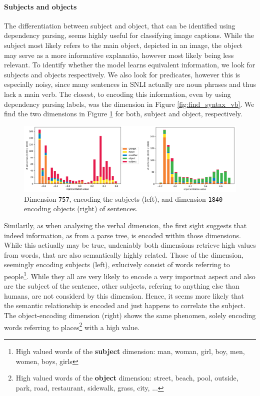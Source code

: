 \paragraph*{Subjects and objects}
The differentiation between subject and object, that can be identified using dependency parsing, seems highly useful for classifying image captions. While the subject most likely refers to the main object, depicted in an image, the object may serve as a more informative explanatio, however most likely being less relevant. To identify whether the model learns equivalent information, we look for subjects and objects respectively. We also look for predicates, however this is especially noisy, since many sentences in \ac{SNLI} actually are noun phrases and thus lack a main verb. The closest, to encoding this information, even by using dependency parsing labels, was the dimension in Figure \ref{fig:find_syntax_vb}. We find the two dimensions in Figure \ref{fig:find_syntax_subj_obj} for both, subject and object, respectively.
\begin{figure}[tph!]
\centering
	\includegraphics[totalheight=5cm]{fig/find_syntax_subj_obj.png}
	\caption{Dimension \texttt{757}, encoding the subjects (left), and dimension \texttt{1840} encoding objects (right) of sentences.}
	\label{fig:find_syntax_subj_obj}
\end{figure}
Similarily, as when analysing the verbal dimension, the first sight suggests that indeed information, as from a parse tree, is encoded within those dimensions. While this actiually may be true, undeniably both dimensions retrieve high values from words, that are also semantically highly related. Those of the dimension, seemingly encoding subjects (left), exlucively consist of words referring to people\footnote{High valued words of the \textbf{subject} dimension: man, woman, girl, boy, men, women, boys, girls}. While they all are very likely to encode a very importnat aspect and also are the subject of the sentence, other subjects, refering to anything else than humans, are not considerd by this dimension. Hence, it seems more likely that the semantic relationship is encoded and just happens to correlate the subject. The object-encoding dimension (right) shows the same phenomen, solely encoding words referring to places\footnote{High valued words of the \textbf{object} dimension: street, beach, pool, outside, park, road, restaurant, sidewalk, grass, city, ...} with a high value.
\newline

